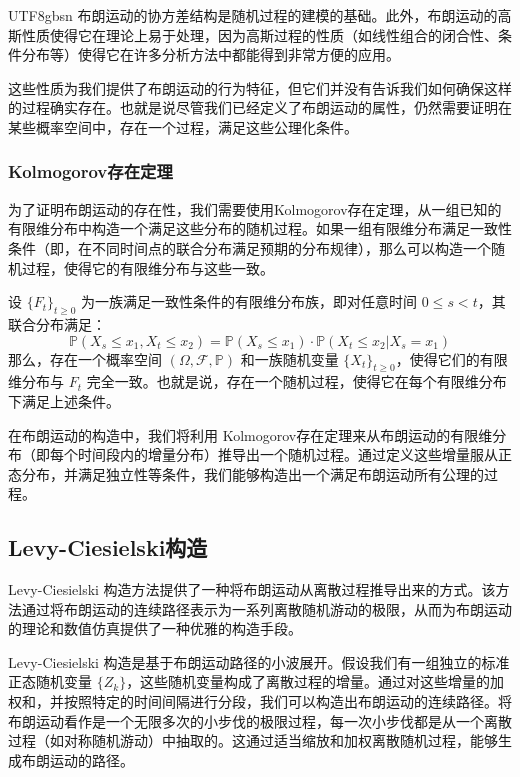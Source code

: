 \documentclass{article}
\begin{document}
\begin{CJK*}{UTF8}{gbsn}
布朗运动的协方差结构是随机过程的建模的基础。此外，布朗运动的高斯性质使得它在理论上易于处理，因为高斯过程的性质（如线性组合的闭合性、条件分布等）使得它在许多分析方法中都能得到非常方便的应用。

这些性质为我们提供了布朗运动的行为特征，但它们并没有告诉我们如何确保这样的过程确实存在。也就是说尽管我们已经定义了布朗运动的属性，仍然需要证明在某些概率空间中，存在一个过程，满足这些公理化条件。

\subsubsection*{Kolmogorov存在定理}

为了证明布朗运动的存在性，我们需要使用Kolmogorov存在定理，从一组已知的有限维分布中构造一个满足这些分布的随机过程。如果一组有限维分布满足一致性条件（即，在不同时间点的联合分布满足预期的分布规律），那么可以构造一个随机过程，使得它的有限维分布与这些一致。

\begin{theorem}[Kolmogorov存在定理]
设 $\{F_t\}_{t \geq 0}$ 为一族满足一致性条件的有限维分布族，即对任意时间 $0 \leq s < t$，其联合分布满足：
\[
\mathbb{P}(X_s \leq x_1, X_t \leq x_2) = \mathbb{P}(X_s \leq x_1) \cdot \mathbb{P}(X_t \leq x_2 | X_s = x_1)
\]
那么，存在一个概率空间 $(\Omega, \mathcal{F}, \mathbb{P})$ 和一族随机变量 $\{X_t\}_{t \geq 0}$，使得它们的有限维分布与 $F_t$ 完全一致。也就是说，存在一个随机过程，使得它在每个有限维分布下满足上述条件。

\end{theorem}

在布朗运动的构造中，我们将利用 Kolmogorov存在定理来从布朗运动的有限维分布（即每个时间段内的增量分布）推导出一个随机过程。通过定义这些增量服从正态分布，并满足独立性等条件，我们能够构造出一个满足布朗运动所有公理的过程。

\subsection{Levy-Ciesielski构造}

Levy-Ciesielski 构造方法提供了一种将布朗运动从离散过程推导出来的方式。该方法通过将布朗运动的连续路径表示为一系列离散随机游动的极限，从而为布朗运动的理论和数值仿真提供了一种优雅的构造手段。

Levy-Ciesielski 构造是基于布朗运动路径的小波展开。假设我们有一组独立的标准正态随机变量 $\{Z_k\}$，这些随机变量构成了离散过程的增量。通过对这些增量的加权和，并按照特定的时间间隔进行分段，我们可以构造出布朗运动的连续路径。将布朗运动看作是一个无限多次的小步伐的极限过程，每一次小步伐都是从一个离散过程（如对称随机游动）中抽取的。这通过适当缩放和加权离散随机过程，能够生成布朗运动的路径。


\end{CJK*}
\end{document}
